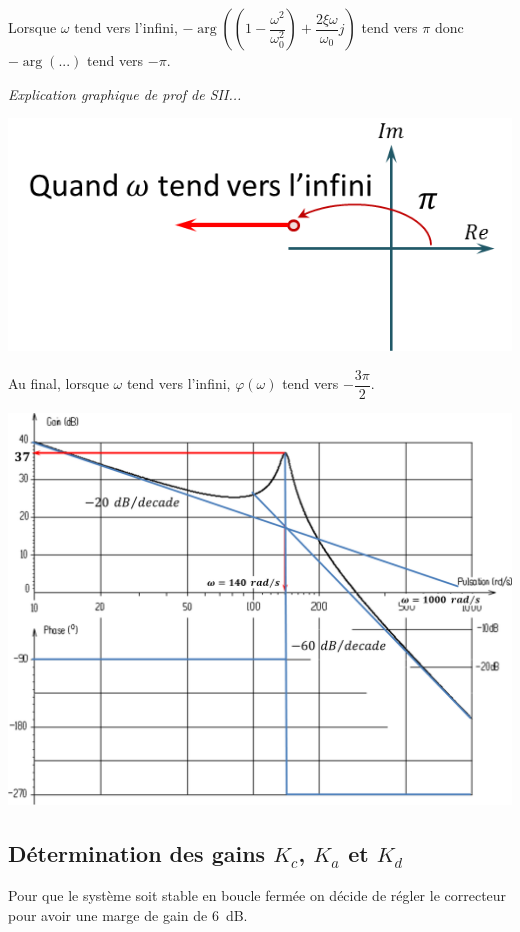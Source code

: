 \documentclass[10pt,fleqn]{article} %
\begin{document}
\begin{multicols}{2}
\begin{corrige}
Lorsque $\omega$ tend vers l'infini,
$-\arg  \left( \left( 1 - \dfrac{\omega^2}{\omega_0^2}\right) + \dfrac{2\xi\omega}{\omega_0} j \right)$ tend vers $\pi$ donc $-\arg(...)$ tend vers $-\pi$.

\textit{Explication graphique de prof de SII...}
\begin{center}
\includegraphics[width=.6\linewidth]{images/cor_02}
\end{center}

Au final, lorsque $\omega$ tend vers l'infini, $\varphi(\omega)$ tend vers $-\dfrac{3\pi}{2}$.

\end{corrige} 

\begin{center}
\includegraphics[width=.8\linewidth]{images/cor_03}
\end{center}

\else \fi




\subsection*{Détermination des gains $K_c$, $K_a$ et $K_d$}
\ifprof
\else
Pour que le système soit stable en boucle fermée on décide de régler le correcteur pour avoir une marge de gain de \SI{6}{dB}.
\fi


\end{multicols}
\end{document}
